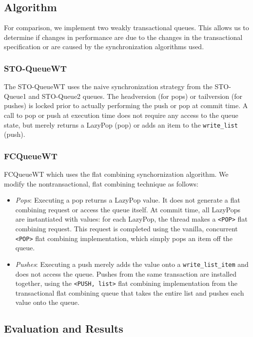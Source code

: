 \subsection{Algorithm}

For comparison, we implement two weakly transactional queues. This allows us to determine if changes in performance are due to the changes in the transactional specification or are caused by the synchronization algorithms used.

\subsubsection{STO-QueueWT}
The STO-QueueWT uses the naive synchronization strategy from the STO-Queue1 and STO-Queue2 queues. The headversion (for pops) or tailversion (for pushes) is locked prior to actually performing the push or pop at commit time. A call to pop or push at execution time does not require any access to the queue state, but merely returns a LazyPop (pop) or adds an item to the \texttt{write\_list} (push).

\subsubsection{FCQueueWT}
FCQueueWT which uses the flat combining synchornization algorithm. We modify the nontransactional, flat combining technique as follows:
\begin{itemize}
    \item \emph{Pops}: 
    Executing a pop returns a LazyPop value. It does not generate a flat combining request or access the queue itself. At commit time, all LazyPops are instantiated with values: for each LazyPop, the thread makes a \texttt{<POP>} flat combining request. This request is completed using the vanilla, concurrent \texttt{<POP>} flat combining implementation, which simply pops an item off the queue.

    \item \emph{Pushes}: 
    Executing a push merely adds the value onto a \texttt{write\_list\_item} and does not access the queue. Pushes from the same transaction are installed together, using the \texttt{<PUSH, list>} flat combining implementation from the transactional flat combining queue that takes the entire list and pushes each value onto the queue.
\end{itemize}

\subsection{Evaluation and Results}

